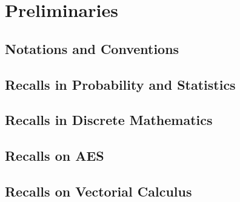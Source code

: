 \chapter{Preliminaries}
\minitoc
\newpage
\section{Notations and Conventions}
	\label{sec:notations}
	

\section{Recalls in Probability and Statistics}
	

\section{Recalls in Discrete Mathematics}
	

\section{Recalls on AES}
	

\section{Recalls on Vectorial Calculus}
	
